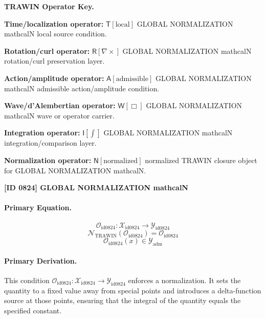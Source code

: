 \par\vspace{0.45\baselineskip}
\noindent\begin{minipage}[t]{\linewidth}
\begingroup
\small
\raggedright
\textbf{TRAWIN Operator Key.}\par
\noindent\textbf{Time/localization operator:} $\mathsf{T}\!\left[\mathrm{local}\right]$ GLOBAL NORMALIZATION mathcalN local source condition.\par
\noindent\textbf{Rotation/curl operator:} $\mathsf{R}\!\left[\nabla\times\right]$ GLOBAL NORMALIZATION mathcalN rotation/curl preservation layer.\par
\noindent\textbf{Action/amplitude operator:} $\mathsf{A}\!\left[\mathrm{admissible}\right]$ GLOBAL NORMALIZATION mathcalN admissible action/amplitude condition.\par
\noindent\textbf{Wave/d'Alembertian operator:} $\mathsf{W}\!\left[\Box\right]$ GLOBAL NORMALIZATION mathcalN wave or operator carrier.\par
\noindent\textbf{Integration operator:} $\mathsf{I}\!\left[\int\right]$ GLOBAL NORMALIZATION mathcalN integration/comparison layer.\par
\noindent\textbf{Normalization operator:} $\mathsf{N}\!\left[\mathrm{normalized}\right]$ normalized TRAWIN closure object for GLOBAL NORMALIZATION mathcalN.\par
\endgroup
\end{minipage}

\clearpage
\noindent\textbf{[ID 0824] GLOBAL NORMALIZATION mathcalN}\par
\vspace{0.35em}
\paragraph{Primary Equation.}
\[
\mathcal{O}_{\mathrm{id0824}}:\mathcal{X}_{\mathrm{id0824}}\longrightarrow\mathcal{Y}_{\mathrm{id0824}}
\]
\[
\mathcal{N}_{\mathrm{TRAWIN}}(\mathcal{O}_{\mathrm{id0824}})=\mathcal{O}_{\mathrm{id0824}}
\]
\[
\mathcal{O}_{\mathrm{id0824}}(x)\in\mathcal{Y}_{\mathrm{adm}}
\]

\paragraph{Primary Derivation.}
This condition \( \mathcal{O}_{\mathrm{id0824}}:\mathcal{X}_{\mathrm{id0824}}\longrightarrow\mathcal{Y}_{\mathrm{id0824}} \) enforces a normalization. It sets the quantity to a fixed value away from special points and introduces a delta-function source at those points, ensuring that the integral of the quantity equals the specified constant.
